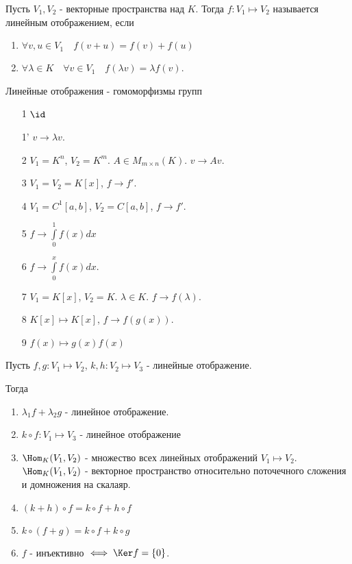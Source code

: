 \begin{definition} \thmslashn 

    Пусть $V_1, V_2$ - векторные пространства над $K$. Тогда $f : V_1 \mapsto V_2$ называется линейным отображением, если 
    \begin{enumerate}
        \item $\forall{v, u\in V_1}\quad f(v + u) = f(v) + f(u)$ 
        \item $\forall{\lambda\in K}\quad \forall{v\in V_1}\quad f(\lambda v) = \lambda f(v)$.
    \end{enumerate}
\end{definition}
\begin{remark} \thmslashn

    Линейные отображения - гомоморфизмы групп
\end{remark}
\begin{example} \thmslashn

   \begin{enumerate}
       \item[1] $\id$ 
       \item[1'] $v \to  \lambda v$.
       \item[2] $V_1 = K^{n}$, $V_2 = K^{m}$. $A\in M_{m \times n}(K)$. $v \to  Av$.
       \item[3] $V_1 = V_2 = K[x]$, $f \to f'$.
       \item[4] $V_1 = C^{1}[a, b]$, $V_2 = C[a, b]$, $f \to f'$.
       \item[5] $f \to \int\limits_{0}^{1} f(x)dx $ 
       \item[6] $f \to  \int\limits_{0}^{x} f(x)dx $.
       \item[7] $V_1 = K[x]$, $V_2 = K$. $\lambda\in K$. $f \to f(\lambda)$.
       \item[8] $K[x] \mapsto  K[x]$, $f \to f(g(x))$.
       \item[9] $f(x) \mapsto g(x)f(x)$
   \end{enumerate} 
\end{example}
\begin{statement} \thmslashn

    Пусть $f,g : V_1 \mapsto V_2$, $k, h : V_2 \mapsto V_3$ - линейные отображение.

    Тогда
    \begin{enumerate}
        \item $\lambda_1 f + \lambda_2 g$ - линейное отображение.
        \item $k \circ f: V_1 \mapsto V_3$ - линейное отображение
        \item $\Hom_{K}(V_1, V_2)$ - множество всех линейных отображений $V_1 \mapsto V_2$. $\Hom_{K}(V_1, V_2)$ - векторное пространство относительно поточечного сложения и домножения на скалаяр.
        \item $\left( k + h \right) \circ f = k\circ f + h\circ f$ 
        \item $k \circ (f + g) = k\circ f + k\circ g$
        \item $f$ - инъективно $\iff \Ker f = \{0\} $.
    \end{enumerate}
\end{statement}
